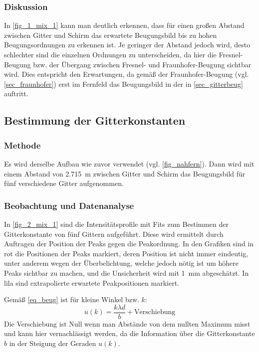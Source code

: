 \documentclass[
	a4paper,
	12pt,
	pagesize,
	ngerman
]{scrartcl}
\begin{document}
	\subsubsection*{Diskussion}
	In \cref{fig_1_mix_1} kann man deutlich erkennen, dass für einen großen Abstand zwischen Gitter und Schirm das erwartete Beugungsbild bis zu hohen Beugungsordnungen zu erkennen ist.
	Je geringer der Abstand jedoch wird, desto schlechter sind die einzelnen Ordnungen zu unterscheiden, da hier die Fresnel-Beugung bzw. der Übergang zwischen Fresnel- und Fraunhofer-Beugung sichtbar wird.
	Dies entspricht den Erwartungen, da gemäß der Fraunhofer-Beugung (vgl. \cref{sec_fraunhofer}) erst im Fernfeld das Beugungsbild in der in \cref{sec_gitterbeug} auftritt.

	\subsection{Bestimmung der Gitterkonstanten}

	\subsubsection*{Methode}

	Es wird derselbe Aufbau wie zuvor verwendet (vgl. \cref{fig_nahfern}).
	Dann wird mit einem Abstand von \SI{2,715}{m} zwischen Gitter und Schirm das Beugungsbild für fünf verschiedene Gitter aufgenommen.

	\subsubsection*{Beobachtung und Datenanalyse}
 In \cref{fig_2_mix_1} sind die Intensitätsprofile mit Fits zum Bestimmen der Gitterkonstante von fünf Gittern aufgeführt.
 Diese wird ermittelt durch Auftragen der Position der Peaks gegen die Peakordnung.
 In den Grafiken sind in rot die Positionen der Peaks markiert, deren Position ist nicht immer eindeutig, unter anderem wegen der Überbelichtung, welche jedoch nötig ist um höhere Peaks sichtbar zu machen, und die Unsicherheit wird mit \SI{1}{mm} abgeschätzt.
 In lila sind extrapolierte erwartete Peakpositionen markiert.

 Gemäß \cref{eq_beug} ist für kleine Winkel bzw. $k$:
 \begin{equation}
	 \label{eq_beug_verschieb}
	 u(k) = \frac{k\lambda d}{b} + \text{Verschiebung}
 \end{equation}
 Die Verschiebung ist Null wenn man Abstände von dem nullten Maximum misst und kann hier vernachlässigt werden, da die Information über die Gitterkonstante $b$ in der Steigung der Geraden $u(k)$.
\end{document}
